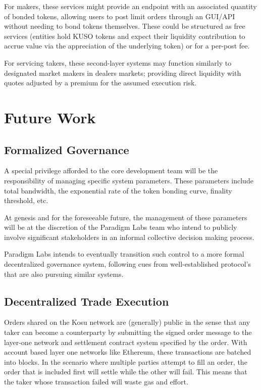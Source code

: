\documentclass[10pt]{article}
\begin{document}
For makers, these services might provide an endpoint with an associated quantity of bonded tokens, allowing users to post limit orders through an GUI/API without needing to bond tokens themselves. These could be structured as free services (entities hold KUSO tokens and expect their liquidity contribution to accrue value via the appreciation of the underlying token) or for a per-post fee.
\medskip

For servicing takers, these second-layer systems may function similarly to designated market makers in dealers markets; providing direct liquidity with quotes adjusted by a premium for the assumed execution risk.
\clearpage
\pagebreak


\section{Future Work}\label{future-work}
\subsection{Formalized Governance}\label{future-work-governance}
A special privilege afforded to the core development team will be the responsibility of managing specific system parameters. These parameters include total bandwidth, the exponential rate of the token bonding curve, finality threshold, etc.
\medskip

At genesis and for the foreseeable future, the management of these parameters will be at the discretion of the Paradigm Labs team who intend to publicly involve significant stakeholders in an informal collective decision making process. 
\medskip

Paradigm Labs intends to eventually transition such control to a more formal decentralized governance system, following cues from well-established protocol’s that are also pursuing similar systems.

\subsection{Decentralized Trade Execution}\label{future-work-tec}
Orders shared on the Kosu network are (generally) public in the sense that any taker can become a counterparty by submitting the signed order message to the layer-one network and settlement contract system specified by the order. With account based layer one networks like Ethereum, these transactions are batched into blocks. In the scenario where multiple parties attempt to fill an order, the order that is included first will settle while the other will fail. This means that the taker whose transaction failed will waste gas and effort.
\medskip
\end{document}
